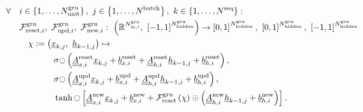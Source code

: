 \begin{align} \label{eq:gru_reset}
    \forall \quad &
    i \in \left\{
        1, \dots, N^\text{gru}_\text{unit}
    \right\}
    ,\ 
    j \in \left\{
        1, \dots, N^\text{batch}
    \right\}
    ,\ 
    k \in \left\{
        1, \dots, N^\text{seq}
    \right\}
    :
    \nonumber \\ &
    \mathcal{F}^\text{gru}_{\text{reset},i}
    ,\ 
    \mathcal{F}^\text{gru}_{\text{upd},i}
    ,\ 
    \mathcal{F}^\text{gru}_{\text{new},i}
    :\
    \left(
        \mathbb{R}^{
            N^\text{gru}_{\text{in},i}
        }
        ,\ 
        \left[
            -1, 1
        \right]^{
            N^\text{gru}_{\text{hidden}}
        }
    \right)
    \rightarrow
    \left[
        0, 1   
    \right]^{
        N^\text{gru}_{\text{hidden}}
    }
    ,\ 
    \left[
        0, 1   
    \right]^{
        N^\text{gru}_{\text{hidden}}
    },\ 
    \left[
        -1, 1   
    \right]^{
        N^\text{gru}_{\text{hidden}}
    }
    \nonumber \\ & \quad
    \chi
    :=
    \left(
        \underline x_{k,j}
        ,\ 
        \underline h_{k-1,j}
    \right)
    \mapsto
    \nonumber \\ & \qquad\qquad
        \sigma \fullmoon \left(
            \underline{\underline A}^\text{reset}_{x,i}
            \underline x_{k,j}
            +
            \underline b^\text{reset}_{x,i}
            +
            \underline{\underline A}^\text{reset}_{h,i}
            \underline h_{k-1,j}
            +
            \underline b^\text{reset}_{h,i}
        \right)
    ,
    \nonumber \\ & \qquad\qquad
        \sigma \fullmoon \left(
            \underline{\underline A}^\text{upd}_{x,i}
            \underline x_{k,j}
            +
            \underline b^\text{upd}_{x,i}
            +
            \underline{\underline A}^\text{upd}_{h,i}
            \underline h_{k-1,j}
            +
            \underline b^\text{upd}_{h,i}
        \right)
    ,
    \nonumber \\ & \qquad\qquad
        \tanh \fullmoon \left[
            \underline{\underline A}^\text{new}_{x,i}
            \underline x_{k,j}
            +
            \underline b^\text{new}_{x,i}
            +
            \mathcal{F}^\text{gru}_\text{reset} \left(
                \chi
            \right)
            \odot
            \left(
                \underline{\underline A}^\text{new}_{h,i}
                \underline h_{k-1,j}
                +
                \underline b^\text{new}_{h,i}
            \right)
        \right]
    .
\end{align}
